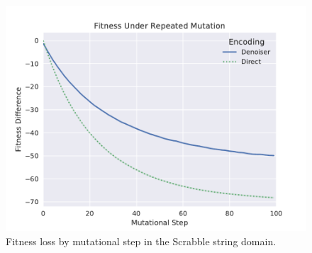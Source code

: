 \begin{figure}
  \includegraphics[width=\linewidth]{img/scrabble_fit_diff_vs_step}
  \caption{Fitness loss by mutational step in the Scrabble string domain.}
  \label{fig:scrabble_fit_diff_vs_step}
\end{figure}

